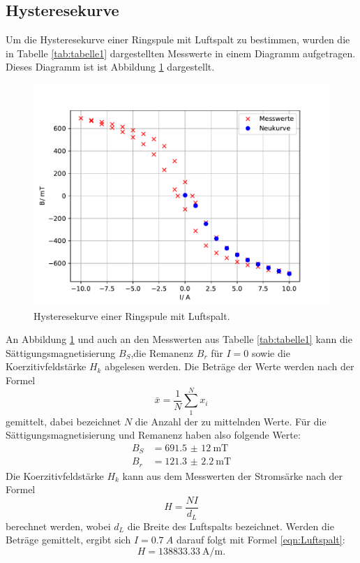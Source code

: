 \subsection{Hysteresekurve}
\noindent Um die Hysteresekurve einer Ringspule mit
Luftspalt zu bestimmen, wurden die in Tabelle
\ref{tab:tabelle1} dargestellten Messwerte in einem
Diagramm aufgetragen. Dieses Diagramm ist ist Abbildung
\ref{fig:plothys} dargestellt.

\begin{figure}
  \centering
  \includegraphics{plothys.pdf}
  \caption{Hysteresekurve einer Ringspule mit Luftspalt.}
  \label{fig:plothys}
\end{figure}
\noindent An Abbildung \ref{fig:plothys} und auch an den
Messwerten
aus Tabelle \ref{tab:tabelle1} kann die
Sättigungsmagnetisierung $B_{S}$,die Remanenz
$B_{r}$ für $I=0$ sowie die Koerzitivfeldstärke
$H_{k}$ abgelesen werden.
Die Beträge der Werte werden nach der Formel
\begin{equation}
  \bar{x}=\frac{1}{N}\sum_{1}^N x_{i}
  \label{eqn:mittel}
\end{equation}
gemittelt, dabei bezeichnet $N$ die Anzahl der zu
mittelnden Werte.
Für die Sättigungsmagnetisierung und
Remanenz haben also folgende Werte:
\begin{align*}
  B_{S} &=\SI{691,5(12)}{\milli\tesla} \\
  B_{r} &=\SI{121.3(22)}{\milli\tesla}
\end{align*}
Die Koerzitivfeldstärke $H_{k}$ kann aus dem Messwerten
der Stromsärke nach der Formel
\begin{equation}
  H=\frac{NI}{d_{L}}
  \label{eqn:Luftspalt}
\end{equation}
berechnet werden, wobei $d_{L}$ die Breite des Luftspalts
bezeichnet.
Werden die Beträge gemittelt, ergibt sich $I=\SI{0.7}{A}$
darauf folgt mit Formel \ref{eqn:Luftspalt}:
\begin{equation*}
  H=\SI{138833,33}{\ampere \per \meter}.
\end{equation*}

